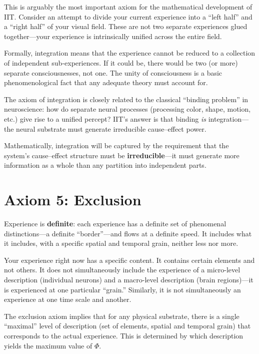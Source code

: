 \documentclass[11pt,a4paper]{report}
\newcommand{\Phi}{\varPhi}
\begin{document}
This is arguably the most important axiom for the mathematical development of IIT. Consider an attempt to divide your current experience into a ``left half'' and a ``right half'' of your visual field. These are not two separate experiences glued together---your experience is intrinsically unified across the entire field.

Formally, integration means that the experience cannot be reduced to a collection of independent sub-experiences. If it could be, there would be two (or more) separate consciousnesses, not one. The unity of consciousness is a basic phenomenological fact that any adequate theory must account for.

\begin{notebox}
The axiom of integration is closely related to the classical ``binding problem'' in neuroscience: how do separate neural processes (processing color, shape, motion, etc.) give rise to a unified percept? IIT's answer is that binding \emph{is} integration---the neural substrate must generate irreducible cause--effect power.
\end{notebox}

Mathematically, integration will be captured by the requirement that the system's cause--effect structure must be \textbf{irreducible}---it must generate more information as a whole than any partition into independent parts.

\section{Axiom 5: Exclusion}

\begin{axiombox}
Experience is \textbf{definite}: each experience has a definite set of phenomenal distinctions---a definite ``border''---and flows at a definite speed. It includes what it includes, with a specific spatial and temporal grain, neither less nor more.
\end{axiombox}

Your experience right now has a specific content. It contains certain elements and not others. It does not simultaneously include the experience of a micro-level description (individual neurons) and a macro-level description (brain regions)---it is experienced at one particular ``grain.'' Similarly, it is not simultaneously an experience at one time scale and another.

The exclusion axiom implies that for any physical substrate, there is a single ``maximal'' level of description (set of elements, spatial and temporal grain) that corresponds to the actual experience. This is determined by which description yields the maximum value of $\Phi$.
\end{document}
